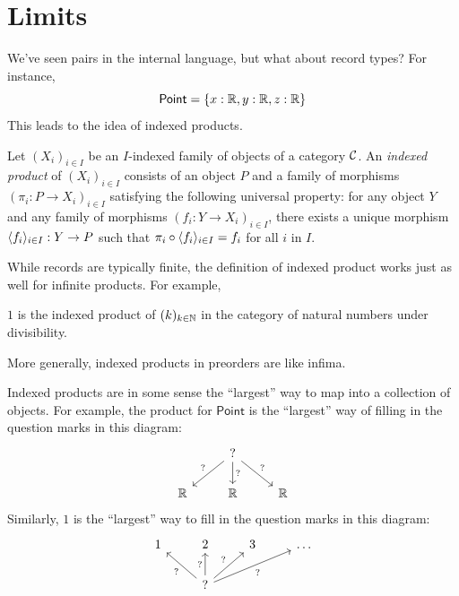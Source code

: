 \chapter{Limits}

We've seen pairs in the internal language, but what about record types?
For instance,
\[
\mathsf{Point} = \{
x: \mathbb R, y: \mathbb R, z: \mathbb R
\}
\]
This leads to the idea of indexed products.
\begin{definition}
  \sloppy
  Let \((X_i)_{i\in I}\) be an \(I\)-indexed
  family of objects of a category \(\mathcal C\).
  An \emph{indexed product} of \((X_i)_{i\in I}\)
  consists of an object \(P\)
  and a family of morphisms \((\pi_i : P \to X_i)_{i\in I}\)
  satisfying the following universal property:
  for any object \(Y\)
  and any family of morphisms \((f_i : Y \to X_i)_{i\in I}\),
  there exists a unique morphism \(\langle f_i\rangle_{i\in I} : Y \to P\)
  such that \(\pi_i \circ \langle f_i\rangle_{i\in I} = f_i\) for all \(i\) in \(I\).
\end{definition}
While records are typically finite, the definition of indexed product
works just as well for infinite products.
For example,
\begin{proposition}
  \(1\) is the indexed product of \((k)_{k\in \mathbb N}\)
  in the category of natural numbers under divisibility.
\end{proposition}
More generally, indexed products in preorders are like infima.

Indexed products are in some sense the ``largest'' way to map
into a collection of objects.
For example, the product for \(\mathsf{Point}\)
is the ``largest'' way of filling in the question marks in this diagram:
\[%
\begin{tikzcd}
   & ? \arrow[ld, "?"'] \arrow[d, "?"] \arrow[rd, "?"] &    \\
\R & \R                                                & \R
\end{tikzcd}\]
Similarly, \(1\) is the ``largest'' way to fill in
the question marks in this diagram:
\[%
\begin{tikzcd}
1 & 2                                                                  & 3 & \dots \\
  & ? \arrow[lu, "?"] \arrow[u, "?"] \arrow[ru, "?"] \arrow[rru, "?"'] &   &
\end{tikzcd}\]

